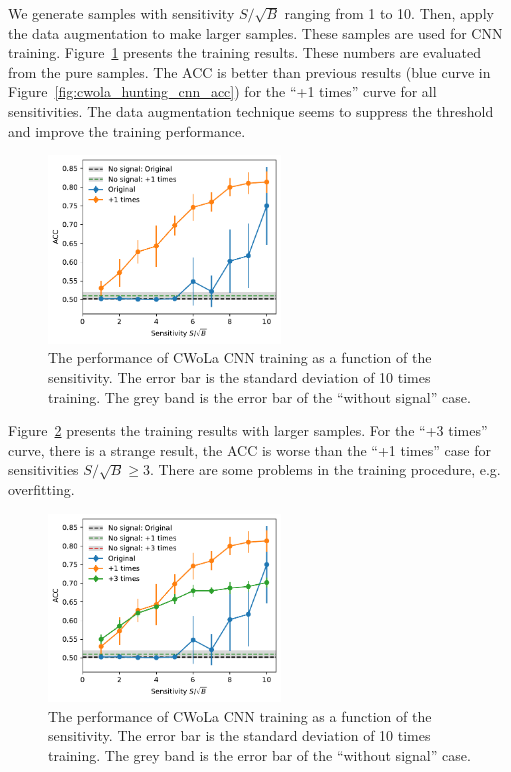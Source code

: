 \documentclass[12pt]{article}
\begin{document}
		We generate samples with sensitivity $S / \sqrt{B}$ ranging from 1 to 10. Then, apply the data augmentation to make larger samples. These samples are used for CNN training. Figure~\ref{fig:cwola_hunting_cnn_acc_data_augmetation} presents the training results. These numbers are evaluated from the pure samples. The ACC is better than previous results (blue curve in Figure~\ref{fig:cwola_hunting_cnn_acc}) for the ``+1 times'' curve for all sensitivities. The data augmentation technique seems to suppress the threshold and improve the training performance.

		\begin{figure}[htpb]
			\centering
			\includegraphics[width=0.55\textwidth]{HVmodel_CWoLa_CNN_aug_1.pdf}
			\caption{The performance of CWoLa CNN training as a function of the sensitivity. The error bar is the standard deviation of 10 times training. The grey band is the error bar of the ``without signal'' case.}
			\label{fig:cwola_hunting_cnn_acc_data_augmetation}
		\end{figure}

		 Figure~\ref{fig:cwola_hunting_cnn_acc_data_augmetation_3_times} presents the training results with larger samples. For the ``+3 times'' curve, there is a strange result, the ACC is worse than the ``+1 times'' case for sensitivities $S / \sqrt{B} \ge 3$. There are some problems in the training procedure, e.g. overfitting.
		\begin{figure}[htpb]
			\centering
			\includegraphics[width=0.55\textwidth]{HVmodel_CWoLa_CNN_aug_1_3.pdf}
			\caption{The performance of CWoLa CNN training as a function of the sensitivity. The error bar is the standard deviation of 10 times training. The grey band is the error bar of the ``without signal'' case.}
			\label{fig:cwola_hunting_cnn_acc_data_augmetation_3_times}
		\end{figure}
\end{document}
